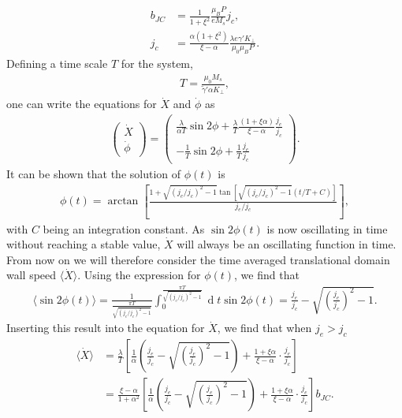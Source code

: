 \documentclass[12pt, a4paper]{article}		%
\renewcommand{\d}[1]{\ensuremath{\operatorname{d}\!{#1}}}
\numberwithin{equation}{section}
\begin{document}
\begin{align}
b_{JC} &= \frac{1}{1+\xi^2}\frac{\mu_B P}{e M_s} j_c, \\
j_c &= \frac{\alpha(1+\xi^2)}{\xi-\alpha}\frac{\lambda e \gamma ' K_{\perp}}{\mu_0\mu_B P}. \label{eq:critical_current}
\end{align}
Defining a time scale $T$ for the system,
\begin{align}
T = \frac{\mu_0 M_s}{\tilde{\gamma}' \alpha K_{\perp}},
\end{align}
one can write the equations for $\dot{X}$ and $\dot{\phi}$ as
\begin{align}
\label{eq:xdot_phidot_v2}
\begin{pmatrix}
\dot{X} \\ \dot{\phi}
\end{pmatrix}
=
\begin{pmatrix}
\frac{\lambda}{\alpha T} \sin2\phi + \frac{\lambda}{T}\frac{(1+\xi\alpha)}{\xi - \alpha} \frac{j_e}{j_c} \\
-\frac{1}{T}  \sin2\phi + \frac{1}{T}\frac{j_e}{j_c}
\end{pmatrix}.
\end{align}
It can be shown that the solution of $\phi(t)$ is
\begin{align}
\phi(t) = \arctan\left[\frac{1+\sqrt{(j_e/j_c)^2-1}\tan\left[\sqrt{(j_e/j_c)^2-1}(t/T+C)\right]}{j_e/j_c}\right],
\end{align}
with $C$ being an integration constant. As $\sin2\phi(t)$ is now oscillating in time without reaching a stable value, $\dot{X}$ will always be an oscillating function in time. From now on we will therefore consider the time averaged translational domain wall speed $\langle \dot{X} \rangle$. Using the expression for $\phi(t)$, we find that
\begin{align}
\langle\sin2\phi(t)\rangle = \frac{1}{\frac{\pi T}{\sqrt{(j_e/j_c)^2-1}}} \int_0^{\frac{\pi T}{\sqrt{(j_e/j_c)^2-1}}} \d t \sin2\phi(t) = \frac{j_e}{j_c}-\sqrt{(\frac{j_e}{j_c})^2-1}.
\end{align}
Inserting this result into the equation for $\dot{X}$, we find that when $j_e > j_c$
\begin{align}
\label{eq:xdot_av_abovecrit}
\nonumber \langle\dot{X}\rangle &= \frac{\lambda}{T}\left[\frac{1}{\alpha}(\frac{j_e}{j_c}-\sqrt{(\frac{j_e}{j_c})^2-1}) + \frac{1+\xi\alpha}{\xi-\alpha}\cdot\frac{j_e}{j_c}\right] \\
&= \frac{\xi-\alpha}{1+\alpha^2} \left[\frac{1}{\alpha}(\frac{j_e}{j_c}-\sqrt{(\frac{j_e}{j_c})^2-1}) + \frac{1+\xi\alpha}{\xi-\alpha}\cdot\frac{j_e}{j_c}\right] b_{JC}.
\end{align}
\end{document}

